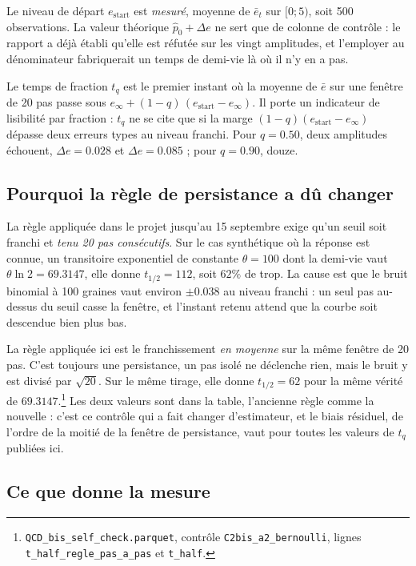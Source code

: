\documentclass[11pt,a4paper]{article}
\begin{document}
Le niveau de départ $e_{\mathrm{start}}$ est \emph{mesuré}, moyenne de $\bar{e}_t$ sur
$[0 ; 5)$, soit 500 observations. La valeur théorique $\hat{p}_0 + \Delta e$ ne sert que de
colonne de contrôle : le rapport a déjà établi qu'elle est réfutée sur les vingt amplitudes,
et l'employer au dénominateur fabriquerait un temps de demi-vie là où il n'y en a pas.

Le temps de fraction $t_q$ est le premier instant où la moyenne de $\bar{e}$ sur une fenêtre
de 20 pas passe sous $e_\infty + (1-q)\,(e_{\mathrm{start}} - e_\infty)$. Il porte un
indicateur de lisibilité par fraction : $t_q$ ne se cite que si la marge
$(1-q)(e_{\mathrm{start}} - e_\infty)$ dépasse deux erreurs types au niveau franchi. Pour
$q = 0.50$, deux amplitudes échouent, $\Delta e = 0.028$ et $\Delta e = 0.085$ ; pour
$q = 0.90$, douze.

\subsection{Pourquoi la règle de persistance a dû changer}
\label{sec:persistance}

La règle appliquée dans le projet jusqu'au 15 septembre exige qu'un seuil soit franchi et
\emph{tenu 20 pas consécutifs}. Sur le cas synthétique où la réponse est connue, un
transitoire exponentiel de constante $\theta = 100$ dont la demi-vie vaut
$\theta \ln 2 = 69.3147$, elle donne $t_{1/2} = 112$, soit $62\%$ de trop. La cause est que
le bruit binomial à 100 graines vaut environ $\pm 0.038$ au niveau franchi : un seul pas
au-dessus du seuil casse la fenêtre, et l'instant retenu attend que la courbe soit descendue
bien plus bas.

La règle appliquée ici est le franchissement \emph{en moyenne} sur la même fenêtre de 20 pas.
C'est toujours une persistance, un pas isolé ne déclenche rien, mais le bruit y est divisé
par $\sqrt{20}$. Sur le même tirage, elle donne $t_{1/2} = 62$ pour la même vérité de
$69.3147$.\footnote{\texttt{QCD\_bis\_self\_check.parquet}, contrôle
\texttt{C2bis\_a2\_bernoulli}, lignes \texttt{t\_half\_regle\_pas\_a\_pas} et
\texttt{t\_half}.} Les deux valeurs sont dans la table, l'ancienne règle comme la nouvelle :
c'est ce contrôle qui a fait changer d'estimateur, et le biais résiduel, de l'ordre de la
moitié de la fenêtre de persistance, vaut pour toutes les valeurs de $t_q$ publiées ici.

\subsection{Ce que donne la mesure}
\end{document}
